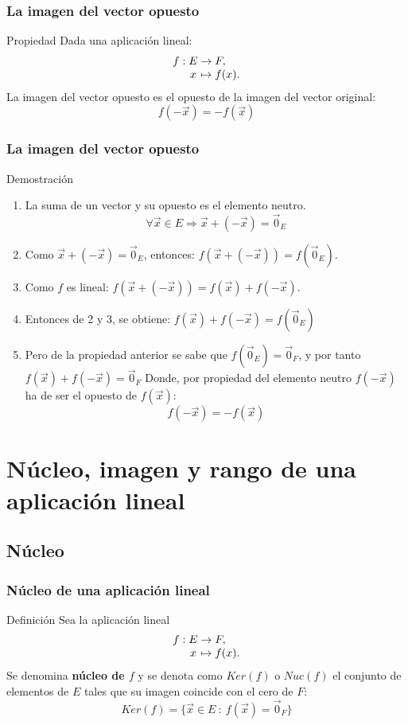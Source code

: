 \documentclass{beamer}
\begin{document}
 \begin{frame}
  \frametitle{La imagen del vector opuesto}
 \begin{block}{Propiedad} 
Dada una aplicaci\'on lineal:
  \[
  \begin{array}{@{}r@{\;}c@{\;}c@{\;}l@{}}
    f: & E & \rightarrow & F,   \\
       & x & \mapsto     & f(x).
  \end{array}
\]
La imagen del vector opuesto es el opuesto de la imagen del vector original:
\[f(-\vec x) = -f(\vec x)\]
\end{block} 
 \end{frame}
 
 
\begin{frame}
  \frametitle{La imagen del vector opuesto}
 \begin{block}{Demostraci\'on} 

\begin{enumerate}
\item La suma de un vector y su opuesto es el elemento neutro.
\[\forall \vec x \in E \Rightarrow \vec x + (-\vec x) = \vec 0_E\]
\item Como $\vec x + (-\vec x) = \vec 0_E$, entonces: $f(\vec x + (-\vec x)) = f(\vec 0_E)$.
\item Como $f$ es lineal: $f(\vec x + (-\vec x)) = f(\vec x) + f(-\vec x)$.
\item Entonces de 2 y 3, se obtiene: $f(\vec x)+ f(-\vec x) = f(\vec 0_E)$
\item Pero de la propiedad anterior se sabe que $f(\vec 0_E) = \vec 0_F$, y por tanto $f(\vec x) + f(-\vec x) = \vec 0_F$
Donde, por propiedad del elemento neutro $f(-\vec x)$ ha de ser el opuesto de $f(\vec x)$: 
\[f(-\vec x) = -f(\vec x)\]
\end{enumerate}
\end{block} 
 \end{frame}
 

\section{N\'ucleo, imagen y rango de una aplicaci\'on lineal}

\subsection{N\'ucleo}

\begin{frame}
  \frametitle{N\'ucleo de una aplicaci\'on lineal}
 \begin{block}{Definici\'on} 
Sea la aplicaci\'on lineal \[
  \begin{array}{@{}r@{\;}c@{\;}c@{\;}l@{}}
    f: & E & \rightarrow & F,   \\
       & x & \mapsto     & f(x).
  \end{array}
\] 
Se denomina \textbf{n\'ucleo de $f$} y se denota como $Ker(f)$ o $Nuc(f)$ el conjunto de elementos de $E$ tales que su imagen coincide con el cero de $F$:
\[Ker(f) = \{\vec x\in E\ : \ f(\vec x) = \vec 0_F\}\]
\end{block} 
 \end{frame}
\end{document}
